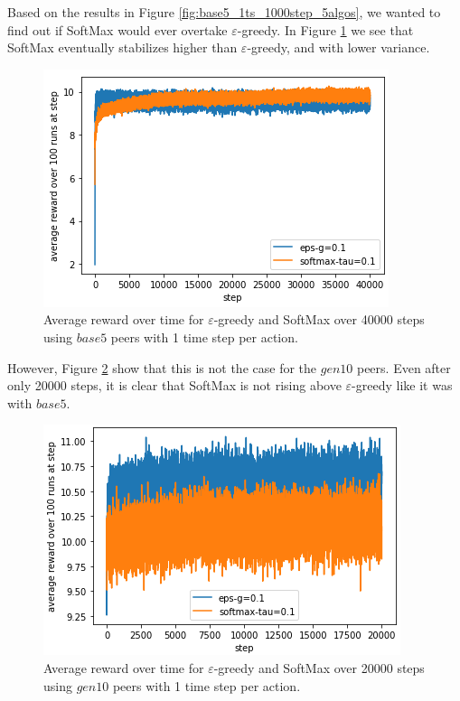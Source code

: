 \documentclass{article}
\begin{document}
Based on the results in Figure \ref{fig:base5_1ts_1000step_5algos}, we wanted to find out if SoftMax would ever overtake $\varepsilon$-greedy. In 
Figure \ref{fig:base5_1ts_40000step_eps_sm} we see that SoftMax eventually stabilizes higher than $\varepsilon$-greedy, and with lower variance.
\begin{figure}[h]
    \centering
    \includegraphics[width=1\linewidth]{figs/base5_1ts_40000step_eps-g_softmax.png}
    \caption{Average reward over time for $\varepsilon$-greedy and SoftMax over 40000 steps using $base5$ peers with 1 time step per action.}
    \label{fig:base5_1ts_40000step_eps_sm}
\end{figure}

However, Figure \ref{fig:gen10_1ts_20000step_eps_sm} show that this is not the case for the $gen10$ peers. Even after only 20000 steps, it is clear that SoftMax 
is not rising above $\varepsilon$-greedy like it was with $base5$. 
\begin{figure}[h]
    \centering
    \includegraphics[width=1\linewidth]{figs/gen10_1ts_20000step_eps-g_softmax.png}
    \caption{Average reward over time for $\varepsilon$-greedy and SoftMax over 20000 steps using $gen10$ peers with 1 time step per action.}
    \label{fig:gen10_1ts_20000step_eps_sm}
\end{figure}
\end{document}
